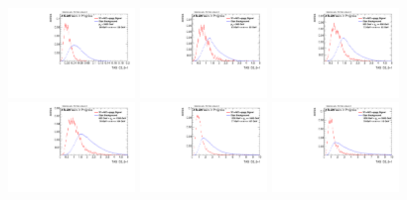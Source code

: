 \begin{figure}
\includegraphics[width=0.3\textwidth]{sascha_input/Appendix/Distributions/w/distributions/beta1/h_assisted_tj_C2_bin6.pdf} 
\bigskip
\includegraphics[width=0.3\textwidth]{sascha_input/Appendix/Distributions/w/distributions/beta1/h_assisted_tj_D2_bin1.pdf} \hspace{1mm}
\includegraphics[width=0.3\textwidth]{sascha_input/Appendix/Distributions/w/distributions/beta1/h_assisted_tj_D2_bin2.pdf} \hspace{1mm}
\includegraphics[width=0.3\textwidth]{sascha_input/Appendix/Distributions/w/distributions/beta1/h_assisted_tj_D2_bin3.pdf} 
\bigskip
\includegraphics[width=0.3\textwidth]{sascha_input/Appendix/Distributions/w/distributions/beta1/h_assisted_tj_D2_bin4.pdf} \hspace{1mm}
\includegraphics[width=0.3\textwidth]{sascha_input/Appendix/Distributions/w/distributions/beta1/h_assisted_tj_D2_bin5.pdf} \hspace{1mm}

\end{figure}
